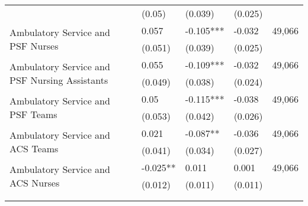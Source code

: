 \begin{table}[H]
\begin{footnotesize}
\begin{center}
{\begin{threeparttable}[b]
\begin{tabular}{rrrrrr}
          &       & \multicolumn{1}{l}{(0.05)} & \multicolumn{1}{l}{(0.039)} & \multicolumn{1}{l}{(0.025)} &  \\
    \multicolumn{1}{l}{\multirow{2}[0]{*}{Ambulatory Service and PSF Nurses}} &       & \multicolumn{1}{l}{0.057} & \multicolumn{1}{l}{-0.105***} & \multicolumn{1}{l}{-0.032} & \multicolumn{1}{c}{        49,066 } \\
          &       & \multicolumn{1}{l}{(0.051)} & \multicolumn{1}{l}{(0.039)} & \multicolumn{1}{l}{(0.025)} &  \\
    \multicolumn{1}{l}{\multirow{2}[0]{*}{Ambulatory Service and PSF Nursing Assistants}} &       & \multicolumn{1}{l}{0.055} & \multicolumn{1}{l}{-0.109***} & \multicolumn{1}{l}{-0.032} & \multicolumn{1}{c}{        49,066 } \\
          &       & \multicolumn{1}{l}{(0.049)} & \multicolumn{1}{l}{(0.038)} & \multicolumn{1}{l}{(0.024)} &  \\
    \multicolumn{1}{l}{\multirow{2}[0]{*}{Ambulatory Service and PSF Teams}} &       & \multicolumn{1}{l}{0.05} & \multicolumn{1}{l}{-0.115***} & \multicolumn{1}{l}{-0.038} & \multicolumn{1}{c}{        49,066 } \\
          &       & \multicolumn{1}{l}{(0.053)} & \multicolumn{1}{l}{(0.042)} & \multicolumn{1}{l}{(0.026)} &  \\
    \multicolumn{1}{l}{\multirow{2}[0]{*}{Ambulatory Service and ACS Teams}} &       & \multicolumn{1}{l}{0.021} & \multicolumn{1}{l}{-0.087**} & \multicolumn{1}{l}{-0.036} & \multicolumn{1}{c}{        49,066 } \\
          &       & \multicolumn{1}{l}{(0.041)} & \multicolumn{1}{l}{(0.034)} & \multicolumn{1}{l}{(0.027)} &  \\
    \multicolumn{1}{l}{\multirow{2}[0]{*}{Ambulatory Service and ACS Nurses}} &       & \multicolumn{1}{l}{-0.025**} & \multicolumn{1}{l}{0.011} & \multicolumn{1}{l}{0.001} & \multicolumn{1}{c}{        49,066 } \\
          &       & \multicolumn{1}{l}{(0.012)} & \multicolumn{1}{l}{(0.011)} & \multicolumn{1}{l}{(0.011)} &  \\
          &       &       &       &       &  \\
    \midrule
    \midrule
          &       &       &       &       &  \\
    \end{tabular}%
    
  \label{table:infra}%

\end{threeparttable}
}
\end{center}
\end{footnotesize}
\end{table}
